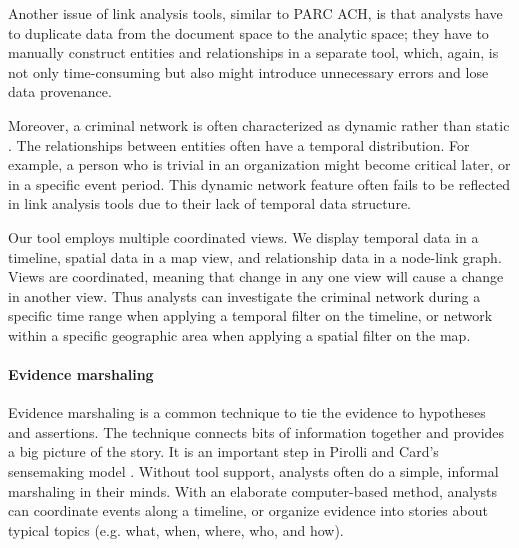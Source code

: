 Another issue of link analysis tools, similar to PARC ACH, is that analysts have to duplicate data from the document space to the analytic space; they have to manually construct entities and relationships in a separate tool, which, again, is not only time-consuming but also might introduce unnecessary errors and lose data provenance. 

Moreover, a criminal network is often characterized as dynamic rather than static \citep{Sparrow1991}. The relationships between entities often have a temporal distribution. For example, a person who is trivial in an organization might become critical later, or in a specific event period. This dynamic network feature often fails to be reflected in link analysis tools due to their lack of temporal data structure. 

Our tool employs multiple coordinated views. We display temporal data in a timeline, spatial data in a map view, and relationship data in a node-link graph. Views are coordinated, meaning that change in any one view will cause a change in another view. Thus analysts can investigate the criminal network during a specific time range when applying a temporal filter on the timeline, or network within a specific geographic area when applying a spatial filter on the map. 

\paragraph{Evidence marshaling}
Evidence marshaling is a common technique to tie the evidence to hypotheses and assertions. The technique connects bits of information together and provides a big picture of the story. It is an important step in Pirolli and Card’s sensemaking model \citep{Pirolli2005}. Without tool support, analysts often do a simple, informal marshaling in their minds. With an elaborate computer-based method, analysts can coordinate events along a timeline, or organize evidence into stories about typical topics (e.g. what, when, where, who, and how).  

